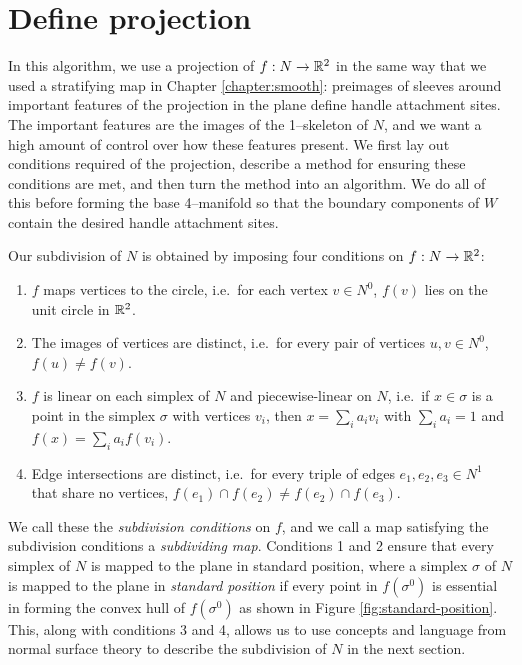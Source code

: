 \section{Define projection}
\label{section:pl-projection}

In this algorithm, we use a projection of $f:N\to\mathbb{R}^2$ in the same way that we used a stratifying map in Chapter \ref{chapter:smooth}: preimages of sleeves around important features of the projection in the plane define handle attachment sites.
The important features are the images of the 1--skeleton of $N$, and we want a high amount of control over how these features present.
We first lay out conditions required of the projection, describe a method for ensuring these conditions are met, and then turn the method into an algorithm.
We do all of this before forming the base 4--manifold so that the boundary components of $W$ contain the desired handle attachment sites.

Our subdivision of $N$ is obtained by imposing four conditions on $f:N\to\mathbb{R}^2$:
\begin{enumerate}
	\item $f$ maps vertices to the circle, i.e.\ for each vertex $v\in N^0$, $f(v)$ lies on the unit circle in $\mathbb{R}^2$.
	
	\item The images of vertices are distinct, i.e.\ for every pair of vertices $u,v\in N^0$, $f(u)\neq f(v)$.
	
	\item $f$ is linear on each simplex of $N$ and piecewise-linear on $N$, i.e.\ if $x\in\sigma$ is a point in the simplex $\sigma$ with vertices $v_i$, then $x=\sum_i a_i v_i$ with $\sum_i a_i = 1$ and $f(x) = \sum_i a_i f(v_i)$.
	
	\item Edge intersections are distinct, i.e.\ for every triple of edges $e_1, e_2, e_3\in N^1$ that share no vertices, $f(e_1)\cap f(e_2)\neq f(e_2)\cap f(e_3)$.
\end{enumerate}

We call these the \emph{subdivision conditions} on $f$, and we call a map satisfying the subdivision conditions a \emph{subdividing map}.
Conditions 1 and 2 ensure that every simplex of $N$ is mapped to the plane in standard position, where a simplex $\sigma$ of $N$ is mapped to the plane in \emph{standard position} if every point in $f(\sigma^0)$ is essential in forming the convex hull of $f(\sigma^0)$ as shown in Figure \ref{fig:standard-position}.
This, along with conditions 3 and 4, allows us to use concepts and language from normal surface theory to describe the subdivision of $N$ in the next section.

